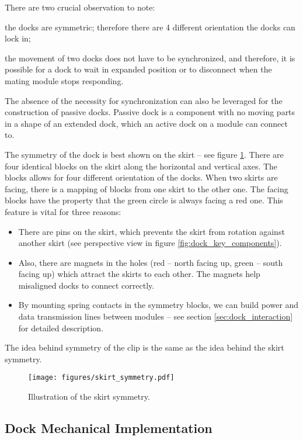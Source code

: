 There are two crucial observation to note:
\begin{enumerate*}
    \item the docks are symmetric; therefore there are 4 different orientation
    the docks can lock in;
    \item the movement of two docks does not have to be synchronized, and
    therefore, it is possible for a dock to wait in expanded position or to
    disconnect when the mating module stops responding.
\end{enumerate*}
The absence of the necessity for synchronization can also be leveraged for the
construction of passive docks. Passive dock is a component with no moving parts
in a shape of an extended dock, which an active dock on a module can connect to.

The symmetry of the dock is best shown on the skirt -- see figure
\ref{fig:dock_skirt_symmetry}. There are four identical blocks on the skirt
along the horizontal and vertical axes. The blocks allows for four different
orientation of the docks. When two skirts are facing, there is a mapping of
blocks from one skirt to the other one. The facing blocks have the property that
the green circle is always facing a red one. This feature is vital for
three reasons:
\begin{itemize}
    \item There are pins on the skirt, which prevents the skirt from
    rotation against another skirt (see perspective view in figure
    \ref{fig:dock_key_components}).
    \item Also, there are magnets in the holes (red -- north facing up, green --
    south facing up) which attract the skirts to each other. The magnets help
    misaligned docks to connect correctly.
    \item By mounting spring contacts in the symmetry blocks, we can build power
    and data transmission lines between modules -- see section
    \ref{sec:dock_interaction} for detailed description.
\end{itemize}
The idea behind symmetry of the clip is the same as the idea behind the skirt
symmetry.

\begin{figure}[!ht]
    \centering
    \texttt{[image: figures/skirt\_symmetry.pdf]}
    \caption{Illustration of the skirt symmetry.}
    \label{fig:dock_skirt_symmetry}
\end{figure}

\subsection{Dock Mechanical Implementation}

